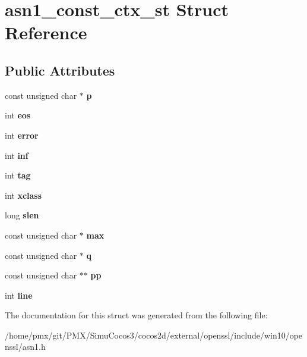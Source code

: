 \hypertarget{structasn1__const__ctx__st}{}\section{asn1\+\_\+const\+\_\+ctx\+\_\+st Struct Reference}
\label{structasn1__const__ctx__st}
\subsection*{Public Attributes}
\begin{DoxyCompactItemize}
\item 
\mbox{\label{structasn1__const__ctx__st_a7b1479e0de9e547ae50c83fa4ffbed07}} 
const unsigned char $\ast$ {\bfseries p}
\item 
\mbox{\label{structasn1__const__ctx__st_a649ad5c068ec65b6d8cee56b95619fc9}} 
int {\bfseries eos}
\item 
\mbox{\label{structasn1__const__ctx__st_aa281e6701fb7934c2cca8c7a686372f8}} 
int {\bfseries error}
\item 
\mbox{\label{structasn1__const__ctx__st_a29867a3ac1efeae0c85e6de7989ce000}} 
int {\bfseries inf}
\item 
\mbox{\label{structasn1__const__ctx__st_afecdc50f4ad882589b5003b96e60a7ef}} 
int {\bfseries tag}
\item 
\mbox{\label{structasn1__const__ctx__st_ae7e37b4b1a3f13d4b220f7ddf084b662}} 
int {\bfseries xclass}
\item 
\mbox{\label{structasn1__const__ctx__st_ae0e8c4c5c13f58bf7ecb108b7c5b5e71}} 
long {\bfseries slen}
\item 
\mbox{\label{structasn1__const__ctx__st_a800940377825d8d1aa2a2040ce78d908}} 
const unsigned char $\ast$ {\bfseries max}
\item 
\mbox{\label{structasn1__const__ctx__st_a114e72fe35806cdb7846e39440450c76}} 
const unsigned char $\ast$ {\bfseries q}
\item 
\mbox{\label{structasn1__const__ctx__st_a576eca9e431bff6f31af32d0973ec700}} 
const unsigned char $\ast$$\ast$ {\bfseries pp}
\item 
\mbox{\label{structasn1__const__ctx__st_acd270a3b54b4ec360447b76a44410943}} 
int {\bfseries line}
\end{DoxyCompactItemize}


The documentation for this struct was generated from the following file\+:\begin{DoxyCompactItemize}
\item 
/home/pmx/git/\+P\+M\+X/\+Simu\+Cocos3/cocos2d/external/openssl/include/win10/openssl/asn1.\+h\end{DoxyCompactItemize}

